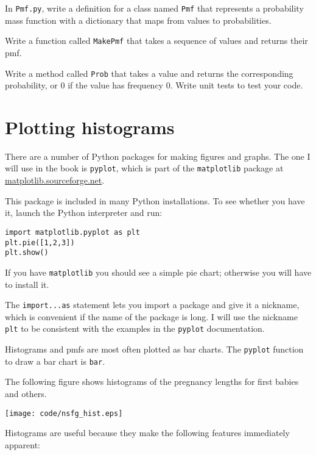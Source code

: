 \documentclass[10pt]{book}
\begin{document}
\begin{ex}
In {\tt Pmf.py}, write a definition for a class named {\tt Pmf} that
represents a probability mass function with a dictionary that maps
from values to probabilities.

Write a function called {\tt MakePmf} that takes a sequence of
values and returns their pmf.

Write a method called {\tt Prob} that
takes a value and returns the corresponding probability, or 0
if the value has frequency 0.  Write unit tests to test your code.
\end{ex}


\section{Plotting histograms}

There are a number of Python packages for making figures and graphs.
The one I will use in the book is {\tt pyplot}, which is part of
the {\tt matplotlib} package at \url{matplotlib.sourceforge.net}.

This package is included in many Python installations.  To see whether
you have it, launch the Python interpreter and run:

\begin{verbatim}
import matplotlib.pyplot as plt
plt.pie([1,2,3])
plt.show()
\end{verbatim}

If you have {\tt matplotlib} you should see a simple pie chart;
otherwise you will have to install it.

The {\tt import...as} statement lets you import a package and give
it a nickname, which is convenient if the name of the package is long.
I will use the nickname {\tt plt} to be consistent with the examples
in the {\tt pyplot} documentation.

Histograms and pmfs are most often plotted as bar charts.  The
{\tt pyplot} function to draw a bar chart is {\tt bar}.

The following figure shows histograms of the pregnancy lengths for
first babies and others.

\beforefig
\centerline{\texttt{[image: code/nsfg\_hist.eps]}}
\afterfig

Histograms are useful because they make the following features immediately
apparent:
\end{document}
